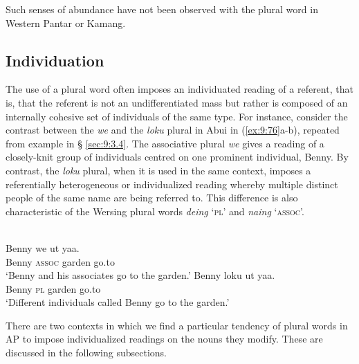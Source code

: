 Such senses of abundance have not been observed with the plural word in Western Pantar or Kamang.

\subsection{Individuation} %
\label{sec:9:4.3}
The use of a plural word often imposes an individuated reading of a referent, that is, that the referent is not an undifferentiated mass but rather is composed of an internally cohesive set of individuals of the same type. For instance, consider the contrast between the \textit{we} and the \textit{loku} plural in Abui in (\ref{ex:9:76}a-b), repeated from example  in {\S} \ref{sec:9:3.4}. The associative plural \textit{we} gives a reading of a closely-knit group of individuals centred on one prominent individual, Benny. By contrast, the \textit{loku} plural, when it is used in the same context, imposes a referentially heterogeneous or individualized reading whereby multiple distinct people of the same name are being referred to. This difference is also characteristic of the Wersing plural words \textit{deing} `\textsc{pl}' and \textit{naing} `\textsc{assoc}'.


\ea%
\label{ex:9:76}
 \\
\ea
\gll Benny we ut yaa. \\
   Benny \textsc{assoc} garden go.to \\
\glt `Benny and his associates go to the garden.'
\ex
\gll Benny loku ut yaa.\\
  Benny \textsc{pl} garden go.to  \\
\glt  `Different individuals called Benny go to the garden.'
\z
\z





There are two contexts in which we find a particular tendency of plural words in AP to impose individualized readings on the nouns they modify. These are discussed in the following subsections.

